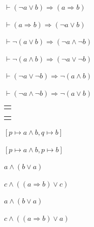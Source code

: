 \documentclass{article}
\newcommand{\imp}{\Rightarrow}
\begin{document}
\clearpage%

$\vdash  (\neg a\vee b) \Rightarrow (a \Rightarrow b)$

\clearpage%

$\vdash  (a \Rightarrow b) \Rightarrow (\neg a\vee b)$

\clearpage%

$\vdash  \neg (a\vee b) \Rightarrow (\neg a \wedge \neg b)$

\clearpage%

$\vdash  \neg (a\wedge b) \Rightarrow (\neg a \vee \neg b)$

\clearpage%

$\vdash (\neg a \vee \neg b) \Rightarrow \neg (a\wedge b)$

\clearpage%

$\vdash (\neg a \wedge \neg b) \Rightarrow \neg (a\vee b)$

\clearpage%

  \begin{center}
    \begin{tabular}{c}
    \mbox{}
    \end{tabular}
  \end{center}

\clearpage%

  \begin{center}
    \begin{tabular}{c}
    \mbox{}
    \end{tabular}
  \end{center}

\clearpage%

$[p\mapsto a\wedge b,q\mapsto b]$

\clearpage%

$[p\mapsto a\wedge b,p\mapsto b]$

\clearpage%

$a\wedge (b\vee a)$

\clearpage%

$c\wedge ((a\imp b)\vee c)$

\clearpage%

$a\wedge (b\vee a)$

\clearpage%

$c\wedge ((a\imp b)\vee a)$

\clearpage%
\end{document}
